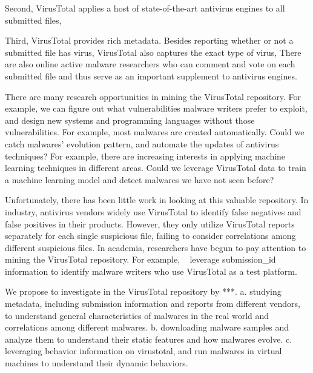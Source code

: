 Second, VirusTotal applies a host of state-of-the-art antivirus engines to all submitted files,


Third, VirusTotal provides rich metadata. 
Besides reporting whether or not a submitted file has virus, 
VirusTotal also captures the exact type of virus, 
There are also online active malware researchers 
who can comment and vote on each submitted file 
and thus serve as an important supplement to antivirus engines. 

There are many research opportunities in mining the VirusTotal repository. 
For example, we can figure out what vulnerabilities malware writers prefer to exploit, 
and design new systems and programming languages without those vulnerabilities. 
For example, most malwares are created automatically. 
Could we catch malwares' evolution pattern, and automate the updates of antivirus techniques?
For example, there are increasing interests in applying machine learning techniques in different areas. 
Could we leverage VirusTotal data to train a machine learning model and detect malwares we have not seen before? 

Unfortunately, there has been little work in looking at this valuable repository.
In industry, antivirus vendors widely use VirusTotal to identify false negatives 
and false positives in their products. 
However, they only utilize VirusTotal reports separately for each single suspicious file, 
failing to consider correlations among different suspicious files. 
In academia, researchers have begun to pay attention to mining the VirusTotal repository. 
For example, ~\citet{neeles} leverage submission\_id information to identify malware writers 
who use VirusTotal as a test platform. 

We propose to investigate in the VirusTotal repository by ***.
a. studying metadata, including submission information and reports from different vendors, 
to understand general characteristics of malwares in the real world and correlations among different malwares. 
b. downloading malware samples and analyze them to understand their static features and how malwares evolve. 
c. leveraging behavior information on virustotal, and run malwares in virtual machines to understand their dynamic behaviors. 

